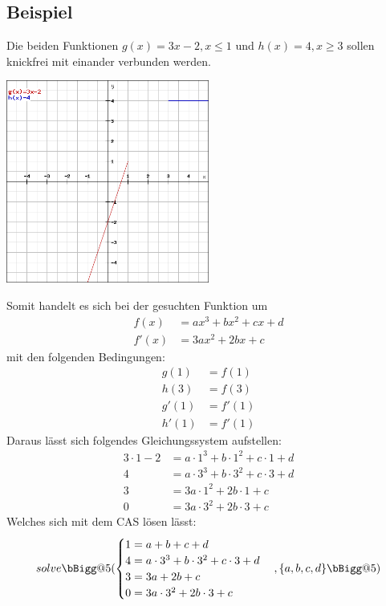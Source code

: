 \documentclass[a4paper,12pt]{article}
\makeatletter
\newcommand{\Vast}{\bBigg@{5}}
\makeatother
\begin{document}
\subsection{Beispiel}
Die beiden Funktionen $g(x) = 3x-2, x \leq 1$ und $h(x) = 4, x \geq 3$ sollen knickfrei mit einander verbunden werden.
\begin{center}
\includegraphics[width=0.5\textwidth]{image1.png}
\end{center}
Somit handelt es sich bei der gesuchten Funktion um
\begin{equation*}
\begin{split}
f(x) & = ax^3 + bx^2 + cx + d\\
f'(x) & = 3ax^2 + 2bx + c
\end{split}
\end{equation*}
mit den folgenden Bedingungen:
\begin{equation*}
\begin{split}
g(1) & = f(1)\\
h(3) & = f(3)\\
g'(1) & = f'(1)\\
h'(1) & = f'(1)
\end{split}
\end{equation*}
Daraus lässt sich folgendes Gleichungssystem aufstellen:
\begin{equation*}
\begin{split}
3\cdot 1-2 & = a\cdot 1^3 + b\cdot 1^2 + c\cdot 1 + d\\
4 & = a\cdot 3^3 + b\cdot 3^2 + c\cdot 3 + d\\
3 & = 3a\cdot 1^2 + 2b \cdot 1 + c\\
0 & = 3a\cdot 3^2 + 2b\cdot 3 + c
\end{split}
\end{equation*}
Welches sich mit dem CAS lösen lässt:
\[
solve \Vast(
\begin{cases}
1 = a + b + c + d\\
4 = a\cdot 3^3 + b\cdot 3^2 + c\cdot 3 + d\\
3 = 3a + 2b  + c\\
0 = 3a\cdot 3^2 + 2b\cdot 3 + c
\end{cases}
,\{a,b,c,d\}\Vast)
\]
\end{document}

